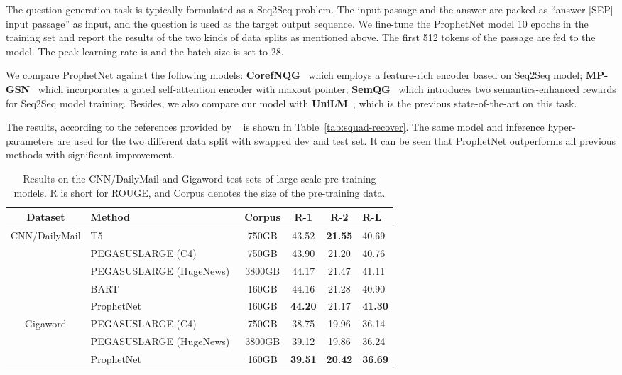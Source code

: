 \documentclass[11pt,a4paper]{article}
\begin{document}
The question generation task is typically formulated as a Seq2Seq problem. 
The input passage and the answer are packed as ``answer [SEP] input passage'' as input, and the question is used as the target output sequence.
We fine-tune the ProphetNet model 10 epochs in the training set and report the results of the two kinds of data splits as mentioned above. 
The first 512 tokens of the passage are fed to the model. 
The peak learning rate is  and the batch size is set to 28.

We compare ProphetNet against the following models: \textbf{CorefNQG}~\cite{du2018harvesting} which employs a feature-rich encoder based on Seq2Seq model; \textbf{MP-GSN}~\cite{zhao2018paragraph} which incorporates a gated self-attention encoder with maxout pointer; \textbf{SemQG}~\cite{zhang2019addressing} which introduces two semantics-enhanced rewards for Seq2Seq model training.
Besides, we also compare our model with \textbf{UniLM}~\cite{dong2019unified}, which is the previous state-of-the-art on this task.


The results, according to the references provided by ~\citet{du2017learning} is shown in Table~\ref{tab:squad-recover}. The same model and inference hyper-parameters are used for the two different data split with swapped dev and test set. It can be seen that ProphetNet outperforms all previous methods with significant improvement. 

\begin{table*}[htbp] 
\small
\begin{center}
\begin{tabular}{clcccl}
\toprule
Dataset & Method & Corpus & R-1 & R-2 & R-L\\
 \midrule
 \multirow{5}{*}{CNN/DailyMail}
  & T5~\cite{raffel2019exploring} & 750GB &  43.52  & \textbf{21.55} & 40.69\\
 & PEGASUSLARGE (C4)~\cite{zhang2019pegasus} & 750GB & 43.90 & 21.20 & 40.76\\
 & PEGASUSLARGE (HugeNews)~\cite{zhang2019pegasus} & 3800GB & 44.17 &21.47 &41.11\\
 & BART~\cite{lewis2019bart}& 160GB  & 44.16 & 21.28 & 40.90\\
 &ProphetNet & 160GB & \textbf{44.20} & 21.17 & \textbf{41.30}\\
 \midrule
 \multirow{3}{*}{Gigaword} & PEGASUSLARGE (C4)~\cite{zhang2019pegasus} & 750GB &   38.75  & 19.96   & 36.14\\
 &PEGASUSLARGE (HugeNews)~\cite{zhang2019pegasus} & 3800GB & 39.12  & 19.86   & 36.24\\
  &ProphetNet & 160GB & \textbf{39.51} & \textbf{20.42} & \textbf{36.69}\\ 
 \bottomrule
\end{tabular}
\end{center}
\caption{Results on the CNN/DailyMail and Gigaword test sets of large-scale pre-training models. R is short for ROUGE, and Corpus denotes the size of the pre-training data.}\label{tab:large} 
\end{table*}
\end{document}
